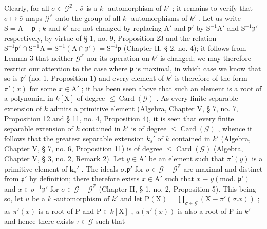 Clearly, for all \(\sigma \in \mathcal{G}^{\mathbb{Z}}\) , \(\bar{\sigma}\) is a \(k\) -automorphism of \(k'\) ; it remains to verify that \(\sigma \mapsto \bar{\sigma}\) maps \(\mathcal{G}^{\mathbb{Z}}\) onto the group of all \(k\) -automorphisms of \(k'\) . Let us write \(\mathrm{S} = \mathrm{A} - \mathfrak{p}\) ; \(k\) and \(k'\) are not changed by replacing \(\mathrm{A}'\) and \(\mathfrak{p}'\) by \(\mathrm{S}^{-1}\mathrm{A}'\) and \(\mathrm{S}^{-1}\mathfrak{p}'\) respectively, by virtue of § 1, no. 9, Proposition 23 and the relation \(\mathrm{S}^{-1}\mathfrak{p}' \cap \mathrm{S}^{-1}\mathrm{A} = \mathrm{S}^{-1}(\mathrm{A} \cap \mathfrak{p}') = \mathrm{S}^{-1}\mathfrak{p}\) (Chapter II, § 2, no. 4); it follows from Lemma 3 that neither \(\mathcal{G}^{\mathbb{Z}}\) nor its operation on \(k'\) is changed; we may therefore restrict our attention to the case where \(\mathfrak{p}\) is maximal, in which case we know that so is \(\mathfrak{p}'\) (no. 1, Proposition 1) and every element of \(k'\) is therefore of the form \(\pi'(x)\) for some \(x \in \mathrm{A}'\) ; it has been seen above that such an element is a root of a polynomial in \(k[\mathrm{X}]\) of degree \(\leqslant \operatorname{Card}(\mathcal{G})\) . As every finite separable extension of \(k\) admits a primitive element (Algebra, Chapter V, § 7, no. 7, Proposition 12 and § 11, no. 4, Proposition 4), it is seen that every finite separable extension of \(k\) contained in \(k'\) is of degree \(\leqslant \operatorname{Card}(\mathcal{G})\) , whence it follows that the greatest separable extension \(k_s'\) of \(k\) contained in \(k'\) (Algebra, Chapter V, § 7, no. 6, Proposition 11) is of degree \(\leqslant \operatorname{Card}(\mathcal{G})\) (Algebra, Chapter V, § 3, no. 2, Remark 2). Let \(y \in \mathrm{A}'\) be an element such that \(\pi'(y)\) is a primitive element of \(\mathbf{k}_s'\) . The ideals \(\sigma .\mathfrak{p}'\) for \(\sigma \in \mathcal{G} - \mathcal{G}^{\mathbb{Z}}\) are maximal and distinct from \(\mathfrak{p}'\) by definition; there therefore exists \(x \in \mathrm{A}'\) such that \(x \equiv y (\text{mod. } \mathfrak{p}')\) and \(x \in \sigma^{-1}\mathfrak{p}'\) for \(\sigma \in \mathcal{G} - \mathcal{G}^{\mathbb{Z}}\) (Chapter II, § 1, no. 2, Proposition 5). This being so, let \(u\) be a \(k\) -automorphism of \(k'\) and let \(\mathrm{P}(\mathrm{X}) = \prod_{\sigma \in \mathcal{G}} (\mathrm{X} - \pi'(\sigma .x))\) ; as \(\pi'(x)\) is a root of P and \(\mathrm{P} \in k[\mathrm{X}]\) , \(u(\pi'(x))\) is also a root of P in \(k'\) and hence there exists \(\tau \in \mathcal{G}\) such that

